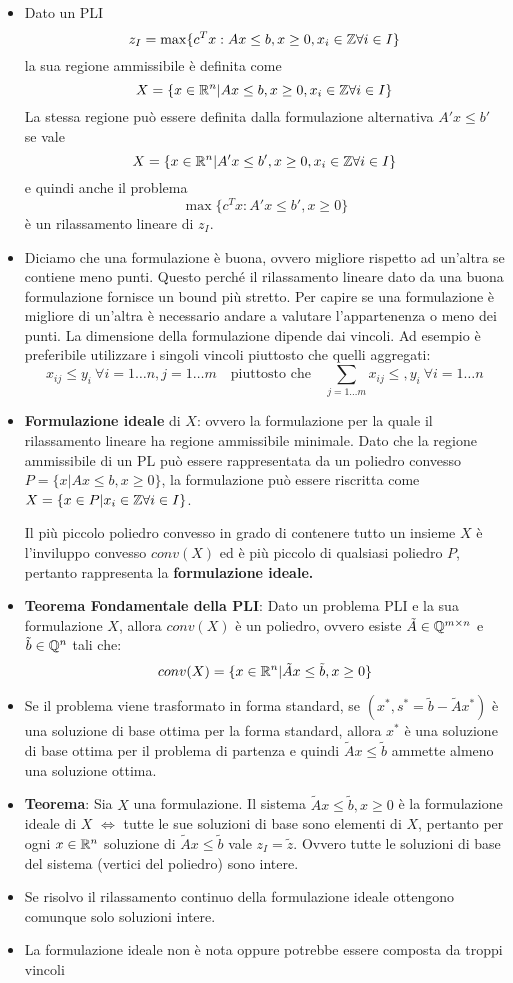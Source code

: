 \begin{itemize}
	\item Dato un PLI
	$$
	z_I = \max \{ c^Tx : Ax \leq b, x \geq 0, x_i \in \mathbb{Z} \forall i \in I\}
	$$
	la sua regione ammissibile è definita come
	$$
	X = \{ x \in \mathbb{R}^n | Ax \leq b, x \geq 0, x_i \in \mathbb{Z} \forall i \in I \}
	$$
	La stessa regione può essere definita dalla formulazione alternativa $A'x \leq b'$ se vale
	$$
	X = \{ x \in \mathbb{R}^n | A'x \leq b', x \geq 0, x_i \in \mathbb{Z} \forall i \in I \}
	$$
	e quindi anche il problema
	$$
	\max \{ c^Tx: A'x \leq b', x\geq 0 \}
	$$
	è un rilassamento lineare di $z_I$.
	\item Diciamo che una formulazione è buona, ovvero migliore rispetto ad un'altra se contiene meno punti. Questo perché il rilassamento lineare dato da una buona formulazione fornisce un bound più stretto. Per capire se una formulazione è migliore di un'altra è necessario andare a valutare l'appartenenza o meno dei punti. La dimensione della formulazione dipende dai vincoli. Ad esempio è preferibile utilizzare i singoli vincoli piuttosto che quelli aggregati:
	$$
	x_{ij} \leq y_i \ \forall i =1 \ldots n,j = 1 \ldots m \quad\text{piuttosto che}\quad \sum_{j = 1 \ldots m}x_{ij}\leq ,y_i  \ \forall i = 1 \ldots n
	$$
	\item \textbf{Formulazione ideale} di $X$: ovvero la formulazione per la quale il rilassamento lineare ha regione ammissibile minimale.
	Dato che la regione ammissibile di un PL può essere rappresentata da un poliedro convesso $P = \{x | Ax \leq b, x \geq 0 \}$, la formulazione può essere riscritta come $X = \{ x \in P | x_i \in \mathbb{Z} \forall i \in I \}$.
	
	Il più piccolo poliedro convesso in grado di contenere tutto un insieme $X$ è l'inviluppo convesso $conv(X)$ ed è più piccolo di qualsiasi poliedro $P$, pertanto rappresenta la \textbf{formulazione ideale.}
	
	\item \textbf{Teorema Fondamentale della PLI}: Dato un problema PLI e la sua formulazione $X$, allora $conv(X)$ è un poliedro, ovvero esiste $\tilde{A} \in \mathbb{Q}^{m \times n}$ e $\tilde{b} \in \mathbb{Q}^n$ tali che:
	$$
	conv(X) = \{ x \in \mathbb{R}^n | \tilde{A}x \leq \tilde{b}, x \geq 0 \}
	$$
	\item Se il problema viene trasformato in forma standard, se $(x^*, s^* = \tilde{b} - \tilde{A}x^*)$ è una soluzione di base ottima per la forma standard, allora $x^*$ è una soluzione di base ottima per il problema di partenza e quindi $\tilde{A}x \leq \tilde{b}$ ammette almeno una soluzione ottima.
	\item \textbf{Teorema}: Sia $X$ una formulazione. Il sistema $\tilde{A}x \leq \tilde{b}, x\geq 0$ è la formulazione ideale di $X$ $\Leftrightarrow$ tutte le sue soluzioni di base sono elementi di $X$, pertanto per ogni $x \in \mathbb{R}^n$ soluzione di $\tilde{A}x \leq \tilde{b}$ vale $z_I = \tilde{z}$. Ovvero tutte le soluzioni di base del sistema (vertici del poliedro) sono intere.
	\item Se risolvo il rilassamento continuo della formulazione ideale ottengono comunque solo soluzioni intere.
	\item La formulazione ideale non è nota oppure potrebbe essere composta da troppi vincoli
\end{itemize}

